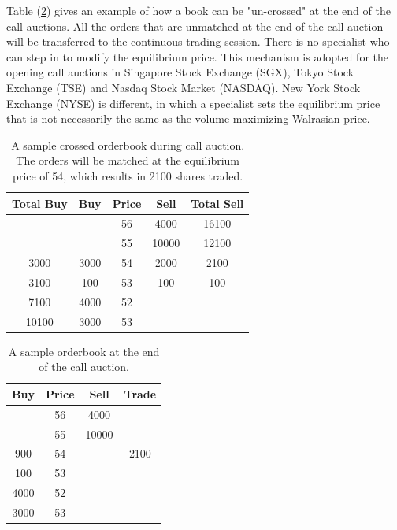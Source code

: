 \documentclass{article}
\begin{document}
Table (\ref{itayoseTable2}) gives an example of how a book can be "un-crossed" at the end of the call auctions. All the orders that are unmatched at the end of the call auction will be transferred to the continuous trading session. There is no specialist who can step in to modify the equilibrium price. This mechanism is adopted for the opening call auctions in Singapore Stock Exchange (SGX), Tokyo Stock Exchange (TSE) and Nasdaq Stock Market (NASDAQ). New York Stock Exchange (NYSE) is different, in which a specialist sets the equilibrium price that is not necessarily the same as the volume-maximizing Walrasian price.

\begin{table}[]
  \centering
  \begin{tabular}{c|c|c|c|c}
    \hline
    \textbf{Total Buy} & \textbf{Buy} & \textbf{Price} & \textbf{Sell} & \textbf{Total Sell} \\ \hline
                       &              & 56             & 4000          & 16100               \\ \hline
                       &              & 55             & 10000         & 12100               \\ \hline
    3000               & 3000         & 54             & 2000          & 2100                \\ \hline
    3100               & 100          & 53             & 100           & 100                 \\ \hline
    7100               & 4000         & 52             &               &                     \\ \hline
    10100              & 3000         & 53             &               &                     \\ \hline
  \end{tabular}

  \caption{A sample crossed orderbook during call auction. The orders will be matched at the equilibrium price of 54, which results in 2100 shares traded.}
  \label{itayoseTable1}
\end{table}


\begin{table}[]
  \centering
  \begin{tabular}{c|c|c|c}
    \hline
    \textbf{Buy} & \textbf{Price} & \textbf{Sell} & \textbf{Trade} \\ \hline
                 & 56             & 4000          &                \\ \hline
                 & 55             & 10000         &                \\ \hline
    900          & 54             &               & 2100           \\ \hline
    100          & 53             &               &                \\ \hline
    4000         & 52             &               &                \\ \hline
    3000         & 53             &               &                \\ \hline
  \end{tabular}
  \caption{A sample orderbook at the end of the call auction.}
  \label{itayoseTable2}
\end{table}
\end{document}
